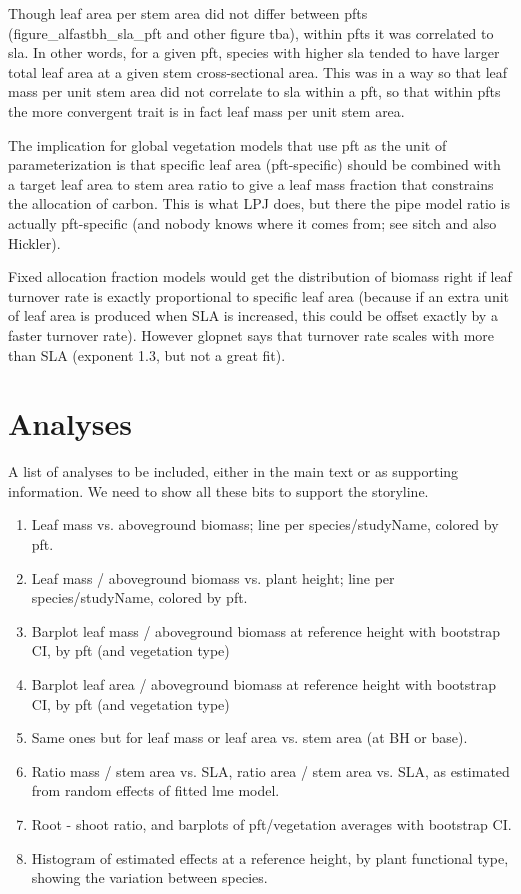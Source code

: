 \documentclass[a4paper]{article}
\begin{document}
Though leaf area per stem area did not differ between pfts (figure\_alfastbh\_sla\_pft and other figure tba), within pfts it was correlated to sla. In other words, for a given pft, species with higher sla tended to have larger total leaf area at a given stem cross-sectional area. This was in a way so that leaf mass per unit stem area did not correlate to sla within a pft, so that within pfts the more convergent trait is in fact leaf mass per unit stem area.

The implication for global vegetation models that use pft as the unit of parameterization is that specific leaf area (pft-specific) should be combined with a target leaf area to stem area ratio to give a leaf mass fraction that constrains the allocation of carbon. This is what LPJ does, but there the pipe model ratio is actually pft-specific (and nobody knows where it comes from; see sitch and also Hickler).

Fixed allocation fraction models would get the distribution of biomass right if leaf turnover rate is exactly proportional to specific leaf area (because if an extra unit of leaf area is produced when SLA is increased, this could be offset exactly by a faster turnover rate). However glopnet says that turnover rate scales with more than SLA (exponent 1.3, but not a great fit). 



\section{Analyses}

A list of analyses to be included, either in the main text or as supporting information. We need to show all these bits to support the storyline.

\begin{enumerate}
  \item Leaf mass vs. aboveground biomass; line per species/studyName, colored by pft.
  \item Leaf mass / aboveground biomass vs. plant height; line per species/studyName, colored by pft.
  \item Barplot leaf mass / aboveground biomass at reference height with bootstrap CI, by pft (and vegetation type)
  \item Barplot leaf area / aboveground biomass at reference height with bootstrap CI, by pft (and vegetation type)
  \item Same ones but for leaf mass or leaf area vs. stem area (at BH or base).
  \item Ratio mass / stem area vs. SLA, ratio area / stem area vs. SLA, as estimated from random effects of fitted lme model.
  \item Root - shoot ratio, and barplots of pft/vegetation averages with bootstrap CI.
  \item Histogram of estimated effects at a reference height, by plant functional type, showing the variation between species. 
\end{enumerate}
\end{document}
